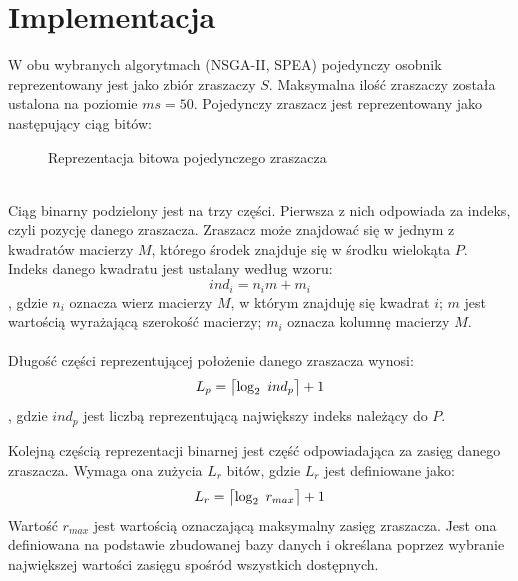 \documentclass[twoside]{iisthesis}
\begin{document}
\section{Implementacja}
W obu wybranych algorytmach (NSGA-II, SPEA) pojedynczy osobnik reprezentowany jest jako zbiór zraszaczy $S$. Maksymalna ilość zraszaczy została ustalona na poziomie $ms = 50$. Pojedynczy zraszacz jest reprezentowany jako następujący ciąg bitów:
\begin{figure}[!htb]
	\centering
	\caption{Reprezentacja bitowa pojedynczego zraszacza}
	\label{fig:sprinkler_bin_repr}
\end{figure}
\\Ciąg binarny podzielony jest na trzy części. Pierwsza z nich odpowiada za indeks, czyli pozycję danego zraszacza. Zraszacz może znajdować się w jednym z kwadratów macierzy $M$, którego środek znajduje się w środku wielokąta $P$. Indeks danego kwadratu jest ustalany według wzoru:
\begin{equation}
	ind_{i} = n_{i} m + m_{i}
\end{equation}
, gdzie $n_{i}$ oznacza wierz macierzy $M$, w którym znajduję się kwadrat $i$; $m$ jest wartością wyrażającą szerokość macierzy; $m_{i}$ oznacza kolumnę macierzy $M$.\\\\
Długość części reprezentującej położenie danego zraszacza wynosi:
\DeclarePairedDelimiter{\ceil}{\lceil}{\rceil}
\begin{equation}
	L_{p} = \ceil[\big]{\log_{2} \text{ } ind_{p}} + 1
\end{equation}
, gdzie $ind_p$ jest liczbą reprezentującą największy indeks należący do $P$.

Kolejną częścią reprezentacji binarnej jest część odpowiadająca za zasięg danego zraszacza. Wymaga ona zużycia $L_{r}$ bitów, gdzie $L_{r}$ jest definiowane jako:
\begin{equation}
	L_{r} = \ceil[\big]{\log_{2} \text{ } r_{max}} + 1
\end{equation}
Wartość $r_{max}$ jest wartością oznaczającą maksymalny zasięg zraszacza. Jest ona definiowana na podstawie zbudowanej bazy danych i określana poprzez wybranie największej wartości zasięgu spośród wszystkich dostępnych.
\end{document}
